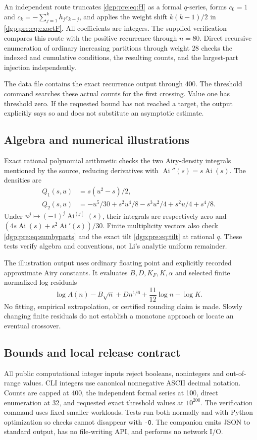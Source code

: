 \documentclass[11pt,letterpaper]{article}
\numberwithin{equation}{section}
\theoremstyle{remark}\newtheorem{remark}[theorem]{Remark}
\newcommand{\Ai}{\operatorname{Ai}}
\begin{document}
An independent route truncates \eqref{dgp:pre:eq:H} as a formal $q$-series,
forms $c_0=1$ and $c_k=-\sum_{j=1}^k h_jc_{k-j}$, and applies the
weight shift $k(k-1)/2$ in \eqref{dgp:pre:eq:exactF}. All coefficients are
integers. The supplied verification compares this route with the
positive recurrence through $n=80$. Direct recursive enumeration of
ordinary increasing partitions through weight 28 checks the indexed
and cumulative conditions, the resulting counts, and the largest-part
injection independently.

The data file contains the exact recurrence output through 400.
The threshold command searches these actual counts for the first
crossing. Value one has threshold zero. If the requested bound has
not reached a target, the output explicitly says so and does not
substitute an asymptotic estimate.

\subsection{Algebra and numerical illustrations}
Exact rational polynomial arithmetic checks the two Airy-density
integrals mentioned by the source, reducing derivatives with
$\Ai''(s)=s\Ai(s)$. The densities are
\begin{align*}
 Q_1(s,u)&=s(u^2-s)/2,\\
 Q_2(s,u)&=-u^5/30+s^2u^4/8-s^3u^2/4+s^2u/4+s^4/8.
\end{align*}
Under $u^j\mapsto(-1)^j\Ai^{(j)}(s)$, their integrals are respectively
zero and $(4s\Ai(s)+s^2\Ai'(s))/30$.
Finite multiplicity vectors also check \eqref{dgp:pre:eq:sumbyparts} and the
exact tilt \eqref{dgp:pre:eq:tilt} at rational $q$. These tests verify algebra
and conventions, not Li's analytic uniform remainder.

The illustration output uses ordinary floating point and explicitly
recorded approximate Airy constants. It evaluates $B,D,K_F,K,\alpha$
and selected finite normalized log residuals
\[
 \log A(n)-B\sqrt n+Dn^{1/6}+\frac{11}{12}\log n-\log K.
\]
No fitting, empirical extrapolation, or certified rounding claim is
made. Slowly changing finite residuals do not establish a monotone
approach or locate an eventual crossover.

\subsection{Bounds and local release contract}
All public computational integer inputs reject booleans, nonintegers
and out-of-range values. CLI integers use canonical nonnegative ASCII
decimal notation. Counts are capped at 400, the independent formal
series at 100, direct enumeration at 32, and requested exact threshold
values at $10^{200}$. The verification command uses fixed smaller
workloads. Tests run both normally and with Python optimization so
checks cannot disappear with \texttt{-O}. The companion emits JSON to
standard output, has no file-writing API, and performs no network I/O.
\end{document}
